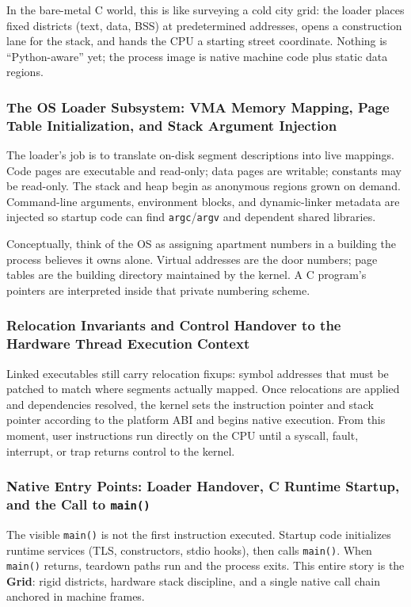 \documentclass[a4paper,twoside]{report}
\begin{document}
In the bare-metal C world, this is like surveying a cold city grid: the loader places fixed districts (text, data, BSS) at predetermined addresses, opens a construction lane for the stack, and hands the CPU a starting street coordinate. Nothing is ``Python-aware'' yet; the process image is native machine code plus static data regions.

\subsubsection{The OS Loader Subsystem: VMA Memory Mapping, Page Table Initialization, and Stack Argument Injection}

The loader's job is to translate on-disk segment descriptions into live mappings. Code pages are executable and read-only; data pages are writable; constants may be read-only. The stack and heap begin as anonymous regions grown on demand. Command-line arguments, environment blocks, and dynamic-linker metadata are injected so startup code can find \texttt{argc}/\texttt{argv} and dependent shared libraries.

Conceptually, think of the OS as assigning apartment numbers in a building the process believes it owns alone. Virtual addresses are the door numbers; page tables are the building directory maintained by the kernel. A C program's pointers are interpreted inside that private numbering scheme.

\subsubsection{Relocation Invariants and Control Handover to the Hardware Thread Execution Context}

Linked executables still carry relocation fixups: symbol addresses that must be patched to match where segments actually mapped. Once relocations are applied and dependencies resolved, the kernel sets the instruction pointer and stack pointer according to the platform ABI and begins native execution. From this moment, user instructions run directly on the CPU until a syscall, fault, interrupt, or trap returns control to the kernel.

\subsubsection{Native Entry Points: Loader Handover, C Runtime Startup, and the Call to \texttt{main()}}

The visible \texttt{main()} is not the first instruction executed. Startup code initializes runtime services (TLS, constructors, stdio hooks), then calls \texttt{main()}. When \texttt{main()} returns, teardown paths run and the process exits. This entire story is the \textbf{Grid}: rigid districts, hardware stack discipline, and a single native call chain anchored in machine frames.
\end{document}
